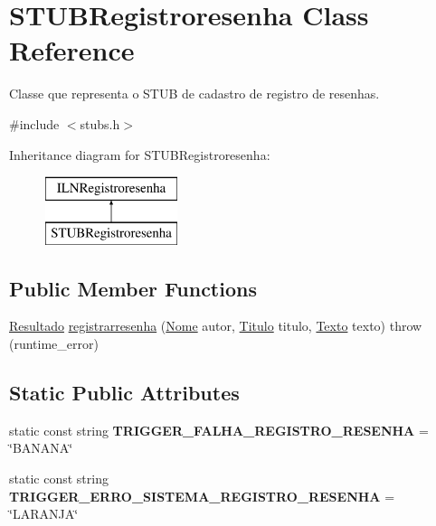 \hypertarget{classSTUBRegistroresenha}{}\section{S\+T\+U\+B\+Registroresenha Class Reference}
\label{classSTUBRegistroresenha}


Classe que representa o S\+T\+UB de cadastro de registro de resenhas.  




{\ttfamily \#include $<$stubs.\+h$>$}

Inheritance diagram for S\+T\+U\+B\+Registroresenha\+:\begin{figure}[H]
\begin{center}
\leavevmode
\includegraphics[height=2.000000cm]{classSTUBRegistroresenha}
\end{center}
\end{figure}
\subsection*{Public Member Functions}
\begin{DoxyCompactItemize}
\item 
\hyperlink{classResultado}{Resultado} \hyperlink{classSTUBRegistroresenha_aeb9e6c0471d7eb40cec96d948ede0b3b}{registrarresenha} (\hyperlink{classNome}{Nome} autor, \hyperlink{classTitulo}{Titulo} titulo, \hyperlink{classTexto}{Texto} texto)  throw (runtime\+\_\+error)
\end{DoxyCompactItemize}
\subsection*{Static Public Attributes}
\begin{DoxyCompactItemize}
\item 
\mbox{\label{classSTUBRegistroresenha_a94328e1c8f7e2e0e6d6483364e2ab68a}} 
static const string {\bfseries T\+R\+I\+G\+G\+E\+R\+\_\+\+F\+A\+L\+H\+A\+\_\+\+R\+E\+G\+I\+S\+T\+R\+O\+\_\+\+R\+E\+S\+E\+N\+HA} = \char`\"{}B\+A\+N\+A\+NA\char`\"{}
\item 
\mbox{\label{classSTUBRegistroresenha_aaa64d45e5b6a55ec5554d3b764d04e74}} 
static const string {\bfseries T\+R\+I\+G\+G\+E\+R\+\_\+\+E\+R\+R\+O\+\_\+\+S\+I\+S\+T\+E\+M\+A\+\_\+\+R\+E\+G\+I\+S\+T\+R\+O\+\_\+\+R\+E\+S\+E\+N\+HA} = \char`\"{}L\+A\+R\+A\+N\+JA\char`\"{}
\end{DoxyCompactItemize}


